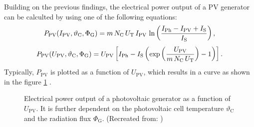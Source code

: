 Building on the previous findings, the electrical power output of a PV generator can be calculted by using one of the following equations:
	\begin{equation} \label{eq:p_pv_i}
	\centering
		P_{\mathrm{PV}}(I_{\mathrm{PV}}, \vartheta_{\mathrm{C}}, \Phi_{\mathrm{G}}) = m \, N_{\mathrm{C}} \, U_{\mathrm{T}} \, I_{\mathrm{PV}} \, \ln \left( \frac{I_{\mathrm{Ph}} - I_{\mathrm{PV}} + I_{\mathrm{S}}}{I_{\mathrm{S}}} \right) \text{,}
	\end{equation}
	\begin{equation} \label{eq:p_pv_u}
	\centering
		 P_{\mathrm{PV}}(U_{\mathrm{PV}}, \vartheta_{\mathrm{C}}, \Phi_{\mathrm{G}}) = U_{\mathrm{PV}} \left[ I_{\mathrm{Ph}} - I_{\mathrm{S}} \left( \exp \left(\frac{U_{\mathrm{PV}}}{m \, N_{\mathrm{C}} \, U_{\mathrm{T}} } \right) - 1  \right) \right] \text{.}
	\end{equation}
Typically, $P_{\mathrm{PV}}$ is plotted as a function of $U_{\mathrm{PV}}$, which results in a curve as shown in the figure \ref{fig:tikz_PVG_power_curve} \cite{Prechtl:2006, Mertens:2015, Wagner:2018}.
\begin{figure}[h!]
	\centering
	
	\caption{Electrical power output of a photovoltaic generator as a function of $U_{\mathrm{PV}}$. It is further dependent on the photovoltaic cell temperature $\vartheta_{\mathrm{C}}$ and the radiation flux $\Phi_{\mathrm{G}}$. (Recreated from: \cite{Mertens:2015})}
	\label{fig:tikz_PVG_power_curve}
\end{figure}
